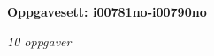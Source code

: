 \centerline{\bf Oppgavesett: i00781no-i00790no}
\vskip 10pt
\centerline{\it 10 oppgaver}\vskip 10pt
\vskip 10pt
